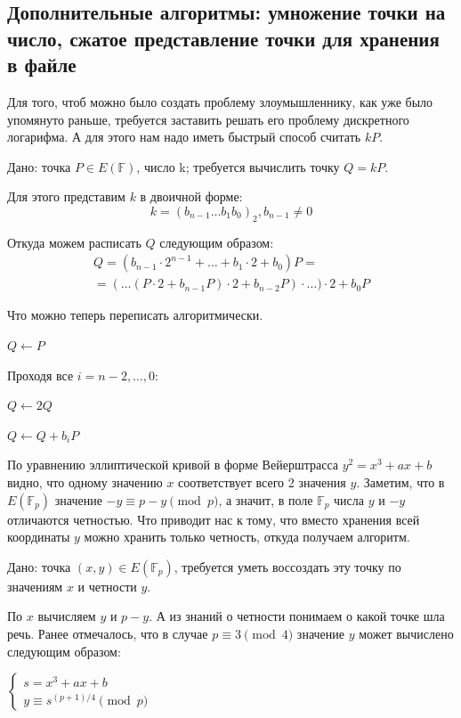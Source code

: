 \subsection{Дополнительные алгоритмы: умножение точки на число, сжатое представление точки для хранения в файле}

Для того, чтоб можно было создать проблему злоумышленнику, как уже было упомянуто раньше, требуется заставить решать его проблему дискретного логарифма. А для этого нам надо иметь быстрый способ считать $kP$.

\begin{tcolorbox}[title=Умножение точки на число]
	Дано: точка $P \in E(\mathbb F)$, число k; требуется вычислить точку $Q=kP$.
	
	Для этого представим $k$ в двоичной форме:
	$$k = (b_{n-1}\dots b_1b_0)_2, b_{n-1} \neq 0$$
	
	Откуда можем расписать $Q$ следующим образом:
	\begin{align*}
		Q = (b_{n-1} \cdot 2^{n-1} + \dots + b_1 \cdot 2 + b_0) P = \\
		= (\dots(P\cdot2 + b_{n-1}P)\cdot2 + b_{n-2}P)\cdot \dots)\cdot2 + b_0P
	\end{align*}
	
	Что можно теперь переписать алгоритмически.
	
	$Q\leftarrow P$
	
	Проходя все $i=n-2,\dots,0$:
	
	$Q\leftarrow 2Q$
	
	$Q\leftarrow Q + b_iP$
\end{tcolorbox}

По уравнению эллиптической кривой в форме Вейерштрасса $y^2 = x^3 + ax + b$ видно, что одному значению $x$ соответствует всего 2 значения $y$. Заметим, что в $E(\mathbb F_p)$ значение $-y \equiv p-y \pmod p$, а значит, в поле $\mathbb F_p$ числа $y$ и $-y$ отличаются четностью. Что приводит нас к тому, что вместо хранения всей координаты $y$ можно хранить только четность, откуда получаем алгоритм.

\begin{tcolorbox}[title=Сжатое представление точки эллиптической кривой]
	Дано: точка $(x, y) \in E(\mathbb F_p)$, требуется уметь воссоздать эту точку по значениям $x$ и четности $y$.
	
	По $x$ вычисляем $y$ и $p-y$. А из знаний о четности понимаем о какой точке шла речь. Ранее отмечалось, что в случае $p\equiv 3 \pmod 4$ значение $y$ может вычислено следующим образом:
	
	$\begin{cases}
		s = x^3 + ax + b \\
		y \equiv s^{(p+1)/4} \pmod p
	\end{cases}$
\end{tcolorbox}

